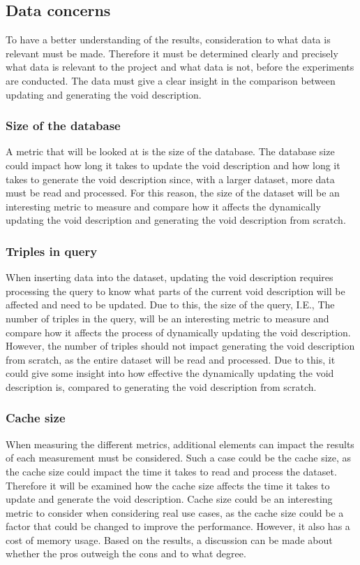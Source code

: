\subsection{Data concerns}\label{sec:concerns}
To have a better understanding of the results, consideration to what data is relevant must be made. Therefore it must be determined clearly and precisely what data is relevant to the project and what data is not, before the experiments are conducted. The data must give a clear insight in the comparison between updating and generating the \gls{void} description.

\subsubsection{Size of the database}
A metric that will be looked at is the size of the database. The database size could impact how long it takes to update the void description and how long it takes to generate the void description since, with a larger dataset, more data must be read and processed. For this reason, the size of the dataset will be an interesting metric to measure and compare how it affects the dynamically updating the \gls{void} description and generating the void description from scratch.

\subsubsection{Triples in query}
When inserting data into the dataset, updating the \gls{void} description requires processing the query to know what parts of the current \gls{void} description will be affected and need to be updated. Due to this, the size of the query, I.E., The number of triples in the query, will be an interesting metric to measure and compare how it affects the process of dynamically updating the \gls{void} description. However, the number of triples should not impact generating the \gls{void} description from scratch, as the entire dataset will be read and processed. Due to this, it could give some insight into how effective the dynamically updating the \gls{void} description is, compared to generating the \gls{void} description from scratch.

\subsubsection{Cache size}
When measuring the different metrics, additional elements can impact the results of each measurement must be considered. Such a case could be the cache size, as the cache size could impact the time it takes to read and process the dataset. Therefore it will be examined how the cache size affects the time it takes to update and generate the \gls{void} description. Cache size could be an interesting metric to consider when considering real use cases, as the cache size could be a factor that could be changed to improve the performance. However, it also has a cost of memory usage. Based on the results, a discussion can be made about whether the pros outweigh the cons and to what degree.

